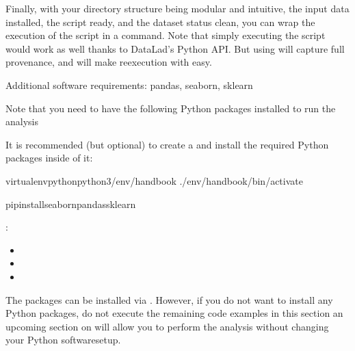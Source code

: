 \sphinxAtStartPar
Finally, with your directory structure being modular and intuitive,
the input data installed, the script ready, and the dataset status clean,
you can wrap the execution of the script in a  command. Note that
simply executing the script would work as well \textendash{} thanks to DataLad’s Python API.
But using  will capture full provenance, and will make
re\sphinxhyphen{}execution with  easy.
\begin{importantnote}[before title={\thetcbcounter\ }, check odd page=true]{Additional software requirements: pandas, seaborn, sklearn}

\sphinxAtStartPar
Note that you need to have the following Python packages installed to run the
analysis%
\begin{footnote}\sphinxAtStartFootnote
It is recommended (but optional) to create a
 and
install the required Python packages inside of it:

\sphinxSetupCodeBlockInFootnote
\begin{sphinxVerbatim}[commandchars=\\\{\}]
virtualenv\PYGZhy{}\PYGZhy{}pythonpython3\PYGZti{}/env/handbook
.\PYGZti{}/env/handbook/bin/activate
\end{sphinxVerbatim}

\sphinxSetupCodeBlockInFootnote
\begin{sphinxVerbatim}[commandchars=\\\{\}]
pipinstallseabornpandassklearn
\end{sphinxVerbatim}
%
\end{footnote}:
\begin{itemize}
\item {} 
\sphinxAtStartPar
{}

\item {} 
\sphinxAtStartPar
{}

\item {} 
\sphinxAtStartPar
{}

\end{itemize}

\sphinxAtStartPar
The packages can be installed via {\hyperref[\detokenize{glossary:term-pip}]{}}.
However, if you do not want to install any
Python packages, do not execute the remaining code examples in this section
\textendash{} an upcoming section on  will allow you to
perform the analysis without changing your Python software\sphinxhyphen{}setup.


\end{importantnote}

